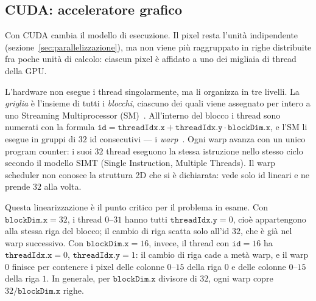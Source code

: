 \subsection{CUDA: acceleratore grafico}
\label{sec:cuda}
Con CUDA cambia il modello di esecuzione. Il pixel resta l'unità indipendente
(sezione~\ref{sec:parallelizzazione}), ma non viene più raggruppato in righe
distribuite fra poche unità di calcolo: ciascun pixel è affidato a uno dei
migliaia di thread della GPU.

L'hardware non esegue i thread singolarmente, ma li organizza in tre livelli. La
\emph{griglia} è l'insieme di tutti i \emph{blocchi}, ciascuno dei quali viene
assegnato per intero a uno Streaming Multiprocessor
(SM)~\cite{nvidia_ada_arch}. All'interno del blocco i thread sono numerati con la formula
$\texttt{id} = \texttt{threadIdx.x} + \texttt{threadIdx.y} \cdot
\texttt{blockDim.x}$, e l'SM li esegue in gruppi di $32$ id consecutivi ---
i \emph{warp}~\cite{nvidia_cuda_cc}. Ogni warp avanza con un unico program counter: i suoi $32$ thread
eseguono la stessa istruzione nello stesso ciclo secondo il modello SIMT
(Single Instruction, Multiple Threads). Il warp scheduler non conosce la
struttura 2D che si è dichiarata: vede solo id lineari e ne prende $32$ alla volta.

Questa linearizzazione è il punto critico per il problema in esame. Con
$\texttt{blockDim.x} = 32$, i thread $0$--$31$ hanno tutti
$\texttt{threadIdx.y} = 0$, cioè appartengono alla stessa riga del blocco; il
cambio di riga scatta solo all'id $32$, che è già nel warp successivo. Con
$\texttt{blockDim.x} = 16$, invece, il thread con $\texttt{id} = 16$ ha
$\texttt{threadIdx.x} = 0$, $\texttt{threadIdx.y} = 1$: il cambio di riga cade
a metà warp, e il warp $0$ finisce per contenere i pixel delle colonne $0$--$15$
della riga $0$ e delle colonne $0$--$15$ della riga $1$. In generale, per
$\texttt{blockDim.x}$ divisore di $32$, ogni warp copre $32/\texttt{blockDim.x}$
righe.

